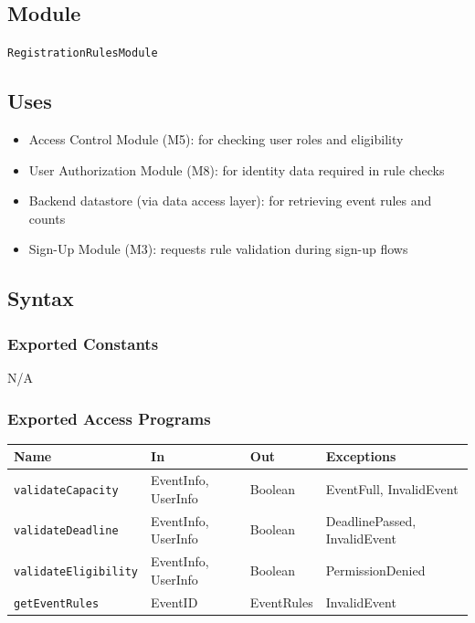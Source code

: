 \documentclass[12pt, titlepage]{article}
\begin{document}
\subsection{Module}

\texttt{RegistrationRulesModule}

\subsection{Uses}

\begin{itemize}
    \item Access Control Module (M5): for checking user roles and eligibility
    \item User Authorization Module (M8): for identity data required in rule checks
    \item Backend datastore (via data access layer): for retrieving event rules and counts
    \item Sign-Up Module (M3): requests rule validation during sign-up flows
\end{itemize}

\subsection{Syntax}

\subsubsection{Exported Constants}

N/A

\subsubsection{Exported Access Programs}

\begin{center}
\renewcommand{\arraystretch}{1.2}
\begin{tabularx}{\textwidth}{l l l X}
\toprule
\textbf{Name} & \textbf{In} & \textbf{Out} & \textbf{Exceptions} \\
\midrule
\texttt{validateCapacity}     & EventInfo, UserInfo & Boolean & EventFull, InvalidEvent \\
\texttt{validateDeadline}     & EventInfo, UserInfo & Boolean & DeadlinePassed, InvalidEvent \\
\texttt{validateEligibility}  & EventInfo, UserInfo & Boolean & PermissionDenied \\
\texttt{getEventRules}        & EventID             & EventRules & InvalidEvent \\
\bottomrule
\end{tabularx}
\end{center}
\end{document}
